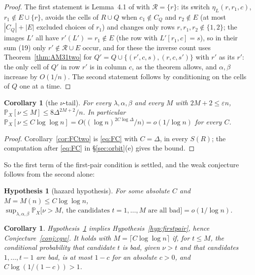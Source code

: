 \documentclass[11pt]{article}
\newtheorem{corollary}[theorem]{Corollary}
\newtheorem{hypothesis}[theorem]{Hypothesis}
\theoremstyle{definition}
\renewcommand{\Pr}{\mathbb{P}}
\begin{document}
\begin{proof}
The first statement is Lemma~4.1 of \cite{AM26} with $\mathcal R=\{r\}$: its switch
$\eta_L(r,r_1,c)$, $r_1\notin E\cup\{r\}$, avoids the cells of $R\cup Q$ when $c_1\notin C_Q$
and $r_2\notin E$ (at most $|C_Q|+|E|$ excluded choices of $r_1$) and changes only rows
$r,r_1,r_2\notin\{1,2\}$; the images $L'$ all have $r'(L')=r_1\notin E$ (the row with
$L'[r_1,c]=s$), so in their sum (19) only $r'\notin\mathcal R\cup E$ occur, and for these
the inverse count uses Theorem~\ref{thm:AM31two} for $Q'=Q\cup\{(r',c,s),(r,c,s')\}$ with
$r'$ as its $r'$: the only cell of $Q'$ in row $r'$ is in column $c$, as the theorem
allows, and $\alpha,\beta$ increase by $O(1/n)$.  The second statement follows by
conditioning on the cells of $Q$ one at a time.
\end{proof}

\begin{corollary}[the $\nu$-tail]\label{cor:nutail}
For every $\lambda,\alpha,\beta$ and every $M$ with $2M+2\le\varepsilon n$,
$\Pr_X[\nu\le M]\le8\Delta^{2M+2}/n$.  In particular
$\Pr_X[\nu\le C\log\log n]=O\bigl((\log n)^{2C\log\Delta}/n\bigr)=o(1/\log n)$ for every $C$.
\end{corollary}

\begin{proof}
Corollary~\ref{cor:FCtwo} is \eqref{eq:FC} with $C=\Delta$, in every $S(R)$; the
computation after \eqref{eq:FC} in \S\ref{sec:orbit}(e) gives the bound.
\end{proof}

So the first term of the first-pair condition is settled, and the weak conjecture follows
from the second alone:

\begin{hypothesis}[hazard hypothesis]\label{hyp:hazard}
For some absolute $C$ and $M=M(n)\le C\log\log n$,
$\displaystyle\sup_{\lambda,\alpha,\beta}\Pr_X\bigl[\nu>M,\ \text{the candidates }t=1,\dots,M\text{ are all bad}\bigr]=o(1/\log n)$.
\end{hypothesis}

\begin{corollary}\label{cor:hazard}
Hypothesis~\ref{hyp:hazard} implies Hypothesis~\ref{hyp:firstpair}, hence
Conjecture~\ref{conj:cgw}.  It holds with $M=\lceil C\log\log n\rceil$ if, for $t\le M$,
the conditional probability that candidate $t$ is bad, given $\nu>t$ and that candidates
$1,\dots,t-1$ are bad, is at most $1-c$ for an absolute $c>0$, and $C\log(1/(1-c))>1$.
\end{corollary}
\end{document}
